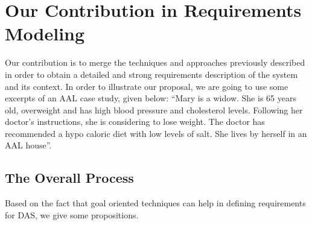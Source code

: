 \documentclass[10pt, conference, compsocconf]{IEEEtran}
\def\sysml{\textsc{SysML}}
\def\kaos{\textsc{Kaos}}
\newcommand{\Myfig}[1]{Figure~\ref{fig:#1}}
\begin{document}








\section{Our Contribution in Requirements Modeling}\label{sec:contrib}

Our contribution is to merge the techniques and approaches previously described in order
to obtain a detailed and strong requirements description of the system and its context.
In order to illustrate our proposal, we are going to use some excerpts of an AAL case study, given below: 
``Mary is a widow. She is 65 years old, overweight and has high blood pressure and cholesterol levels. Following her doctor's instructions, she is considering to lose weight. The doctor has recommended a hypo caloric diet with low levels of salt. She lives by herself in an AAL house''.

\subsection{The Overall Process}



Based on the fact that goal oriented techniques can help in defining requirements for DAS, we give some propositions.
\end{document}
